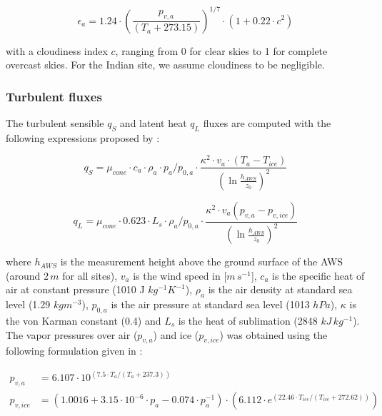 \documentclass[utf8]{frontiersSCNS} %
\begin{document}
\begin{equation} \epsilon_a=1.24 \cdot (\frac{p_{v,a}}{(T_a+273.15)})^{1/7}\cdot(1+0.22\cdot{c}^2) \label{eqn:atm_e}
\end{equation}

with a cloudiness index $c$, ranging from 0 for clear skies to 1 for complete overcast skies. For the Indian site, we
assume cloudiness to be negligible.

\subsubsection{Turbulent fluxes }

The turbulent sensible $q_{S}$ and latent heat $q_{L}$ fluxes are computed with the following expressions proposed by
\cite{Garratt_1992}:

\begin{equation} q_{S}=\mu_{cone}\cdot c_{a} \cdot \rho_{a} \cdot p_{a}/p_{0,a} \cdot \frac{\kappa^2 \cdot v_a \cdot
		(T_a-T_{ice})}{{(\ln{\frac{h_{AWS}}{z_{0}}})}^2} \label{eqn:qs} \end{equation}

\begin{equation} q_{L}=\mu_{cone}\cdot 0.623 \cdot L_s \cdot \rho_{a}/p_{0,a} \cdot \frac{\kappa^2 \cdot
	v_a(p_{v,a}-p_{v,ice})}{{(\ln{\frac{h_{AWS}}{z_{0}}})}^2} \end{equation}

where $h_{AWS}$ is the measurement height above the ground surface of the AWS (around $2\,m$ for all sites), $v_a$ is
the wind speed in [$m\,s^{-1}$], $c_a$ is the specific heat of air at constant pressure (1010 J $kg^{-1} K^{-1}$),
$\rho_{a}$ is the air density at standard sea level (1.29 $kg m^{-3}$), $p_{0,a}$ is the air pressure at standard sea
level (1013 $hPa$), $\kappa$ is the von Karman constant (0.4) and $L_s$ is the heat of sublimation (2848 $kJ\,
	kg^{-1}$).  The vapor pressures over air ($p_{v,a}$) and ice ($p_{v,ice}$) was obtained using the following formulation
given in \cite{WMO_2018}:

\begin{equation} \begin{split} p_{v,a}&=6.107 \cdot 10^{(7.5 \cdot T_a / (T_a + 237.3))}\\ p_{v,ice}&=(1.0016 +
		3.15\cdot10^{-6}\cdot p_{a}-0.074\cdot p_{a}^{-1})\cdot(6.112 \cdot e^{(22.46 \cdot T_{ice} / (T_{ice} + 272.62))})
	\end{split} \label{eqn:vp} \end{equation}
\end{document}
